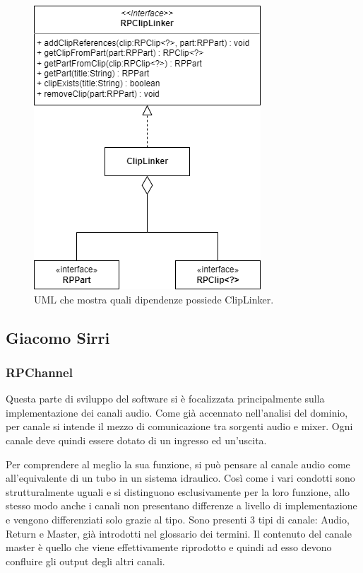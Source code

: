 \documentclass[a4paper,12pt]{report}
\begin{document}
\begin{figure}[H]
\centering{}
\includegraphics[scale=0.75]{img/clipLinker.png}
\caption{UML che mostra quali dipendenze possiede ClipLinker.}
\end{figure}

\subsection{Giacomo Sirri}
\subsubsection{RPChannel}
Questa parte di sviluppo del software si è focalizzata principalmente sulla implementazione dei canali audio. Come già accennato nell’analisi del dominio, per canale si intende il mezzo di comunicazione tra sorgenti audio e mixer. Ogni canale deve quindi essere dotato di un ingresso ed un’uscita. 

Per comprendere al meglio la sua funzione, si può pensare al canale audio come all’equivalente di un tubo in un sistema idraulico. Così come i vari condotti sono strutturalmente uguali e si distinguono esclusivamente per la loro funzione, allo stesso modo anche i canali non presentano differenze a livello di implementazione e vengono differenziati solo grazie al tipo. Sono presenti 3 tipi di canale: Audio, Return e Master, già introdotti nel glossario dei termini.
Il contenuto del canale master è quello che viene effettivamente riprodotto e quindi ad esso devono confluire gli output degli altri canali. 
\end{document}
